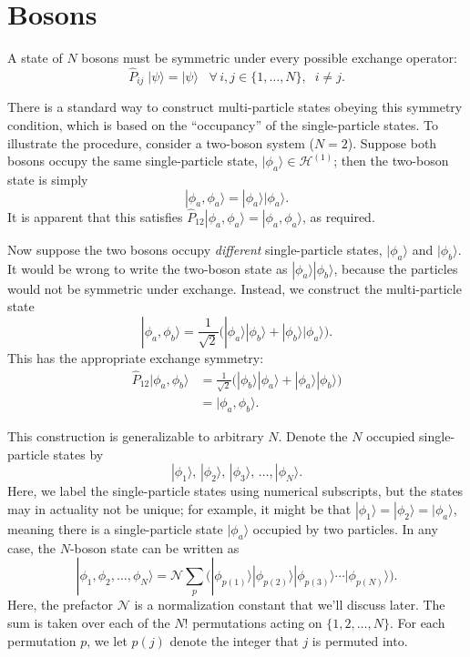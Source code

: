 \documentclass[pra,12pt]{revtex4}
\begin{document}
\section{Bosons}

A state of $N$ bosons must be symmetric under every possible exchange
operator:
$$\hat{P}_{ij}\; |\psi\rangle = |\psi\rangle \;\;\; \forall\, i, j \in\{1,\dots,N\},\;\; i\ne j.$$

There is a standard way to construct multi-particle states obeying
this symmetry condition, which is based on the ``occupancy'' of the
single-particle states.  To illustrate the procedure, consider a
two-boson system ($N = 2$).  Suppose both bosons occupy the same
single-particle state, $|\phi_a\rangle \in \mathscr{H}^{(1)}$; then
the two-boson state is simply
$$|\phi_a,\phi_a\rangle = |\phi_a\rangle  |\phi_a\rangle.$$
It is apparent that this satisfies $\hat{P}_{12}
|\phi_a,\phi_a\rangle = |\phi_a,\phi_a\rangle$, as required.

Now suppose the two bosons occupy \textit{different} single-particle
states, $|\phi_a\rangle$ and $|\phi_b\rangle$.  It would be wrong to
write the two-boson state as $|\phi_a\rangle |\phi_b\rangle$, because
the particles would not be symmetric under exchange.  Instead, we
construct the multi-particle state
$$|\phi_a,\phi_b\rangle = \frac{1}{\sqrt{2}} \Big( |\phi_a\rangle  |\phi_b\rangle + |\phi_b\rangle  |\phi_a\rangle\Big).$$
This has the appropriate exchange symmetry:
$$\begin{aligned}\hat{P}_{12}|\phi_a,\phi_b\rangle &= \frac{1}{\sqrt{2}} \Big( |\phi_b\rangle  |\phi_a\rangle + |\phi_a\rangle  |\phi_b\rangle\Big) \\ &= |\phi_a,\phi_b\rangle.\end{aligned}$$

This construction is generalizable to arbitrary $N$.  Denote the $N$
occupied single-particle states by
$$|\phi_1\rangle, \, |\phi_2\rangle, \, |\phi_3\rangle, \, \dots, |\phi_N\rangle.$$
Here, we label the single-particle states using numerical subscripts,
but the states may in actuality not be unique; for example, it might
be that $|\phi_1\rangle = |\phi_2\rangle = |\phi_a\rangle$, meaning
there is a single-particle state $|\phi_a\rangle$ occupied by two
particles.  In any case, the $N$-boson state can be written as
$$|\phi_1,\phi_2,\dots,\phi_N\rangle = \mathcal{N} \sum_p \Big(|\phi_{p(1)}\rangle  |\phi_{p(2)}\rangle  |\phi_{p(3)}\rangle  \cdots  |\phi_{p(N)}\rangle\Big).$$
Here, the prefactor $\mathcal{N}$ is a normalization constant that
we'll discuss later.  The sum is taken over each of the $N!$
permutations acting on $\{1,2,\dots,N\}$.  For each permutation $p$,
we let $p(j)$ denote the integer that $j$ is permuted into.
\end{document}
